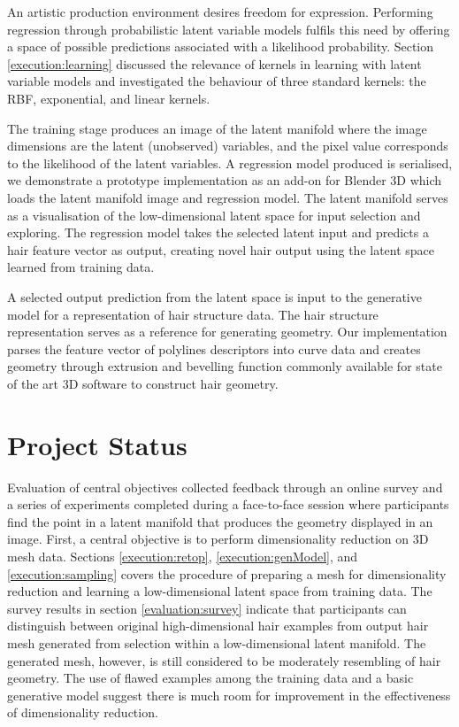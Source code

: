 \documentclass[ %
author={Dillon Keith Diep},
supervisor={Dr. Carl Henrik Ek},
degree={MEng},
title={ART-CG Hair:},
subtitle={Assisted Real-time Content Generation of Stylised Virtual Hair},
type={Research},
year={2017} ]{dissertation}
\begin{document}
	An artistic production environment desires freedom for expression. Performing regression through probabilistic latent variable models fulfils this need by offering a space of possible predictions associated with a likelihood probability.
	Section \ref{execution:learning} discussed the relevance of kernels in learning with latent variable models and investigated the behaviour of three standard kernels: the RBF, exponential, and linear kernels.
	
	The training stage produces an image of the latent manifold where the image dimensions are the latent (unobserved) variables, and the pixel value corresponds to the likelihood of the latent variables.
	A regression model produced is serialised, we demonstrate a prototype implementation as an add-on for Blender 3D which loads the latent manifold image and regression model. The latent manifold serves as a visualisation of the low-dimensional latent space for input selection and exploring. The regression model takes the selected latent input and predicts a hair feature vector as output, creating novel hair output using the latent space learned from training data.
	
	A selected output prediction from the latent space is input to the generative model for a representation of hair structure data. 
	The hair structure representation serves as a reference for generating geometry.
	Our implementation parses the feature vector of polylines descriptors into curve data and creates geometry through extrusion and bevelling function commonly available for state of the art 3D software to construct hair geometry.
	
	\section{Project Status}
	Evaluation of central objectives collected feedback through an online survey and a series of experiments completed during a face-to-face session where participants find the point in a latent manifold that produces the geometry displayed in an image.
	First, a central objective is to perform dimensionality reduction on 3D mesh data.
	Sections \ref{execution:retop}, \ref{execution:genModel}, and \ref{execution:sampling} covers the procedure of preparing a mesh for dimensionality reduction and learning a low-dimensional latent space from training data.
	The survey results in section \ref{evaluation:survey} indicate that participants can distinguish between original high-dimensional hair examples from output hair mesh generated from selection within a low-dimensional latent manifold. The generated mesh, however, is still considered to be moderately resembling of hair geometry. The use of flawed examples among the training data and a basic generative model suggest there is much room for improvement in the effectiveness of dimensionality reduction.
	
\end{document}
